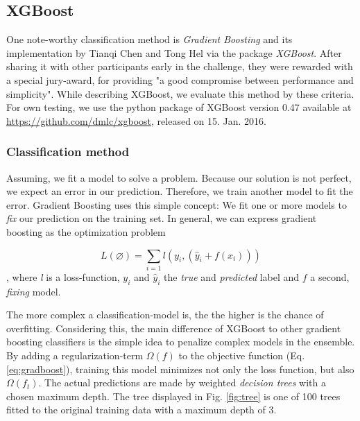 \subsection{XGBoost}\label{sec:xgb}
One note-worthy classification method is \emph{Gradient Boosting} and its implementation by Tianqi Chen and Tong Hel via the package \emph{XGBoost}.
After sharing it with other participants early in the challenge, they were rewarded with a special jury-award, for providing "a good compromise between performance and simplicity"\cite{HEPml}. While describing XGBoost, we evaluate this method by these criteria.
For own testing, we use the python package of XGBoost version 0.47 available at \url{https://github.com/dmlc/xgboost}, released on 15. Jan. 2016.

\subsubsection{Classification method}
Assuming, we fit a model to solve a problem. Because our solution is not perfect, we expect an error in our prediction. Therefore, we train another model to fit the error.
Gradient Boosting uses this simple concept: We fit one or more models to \emph{fix} our prediction on the training set.
In general, we can express gradient boosting as the optimization problem

\begin{equation}\label{eq:gradboost}
	L(\varnothing)= \sum\limits_{i=1} l ( y_i,(\hat{y}_i + f(x_i)))
\end{equation}, where \emph{l} is a loss-function, $y_i$ and $\hat{y}_i$ the \emph{true} and \emph{predicted} label and $f$ a second, \emph{fixing} model.

The more complex a classification-model is, the the higher is the chance of overfitting. Considering this, the main difference of XGBoost to other gradient boosting classifiers is the simple idea to penalize complex models in the ensemble. By adding a regularization-term $\Omega(f)$ to the objective function (Eq.\eqref{eq:gradboost}), training this model minimizes not only the loss function, but also $\Omega(f_t)$.
The actual predictions are made by weighted \emph{decision trees} with a chosen maximum depth. The tree displayed in Fig. \ref{fig:tree} is one of 100 trees fitted to the original training data with a maximum depth of 3.

